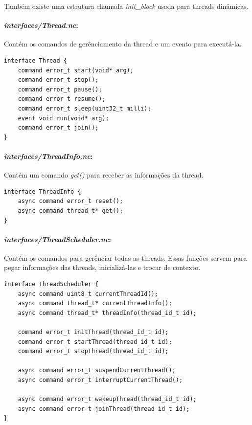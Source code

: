 \documentclass[a4paper, 10pt]{article}
\begin{document}
Também existe uma estrutura chamada \textit{init\_block} usada para threads dinâmicas.

\paragraph{\textit{interfaces/Thread.nc}:} Contém os comandos de gerênciamento da thread e um evento para executá-la.
\begin{lstlisting}
interface Thread {
    command error_t start(void* arg);
    command error_t stop();
    command error_t pause();
    command error_t resume();
    command error_t sleep(uint32_t milli);
    event void run(void* arg);
    command error_t join();
}  
\end{lstlisting}

\paragraph{\textit{interfaces/ThreadInfo.nc}:} Contém um comando \textit{get()} para receber as informações da thread.
\begin{lstlisting}
interface ThreadInfo {
    async command error_t reset();
    async command thread_t* get();
} 
\end{lstlisting}

\paragraph{\textit{interfaces/ThreadScheduler.nc}:} Contém os comandos para gerênciar todas as threads. Essas funções
servem para pegar informações das threads, inicializá-las e trocar de contexto.
\begin{lstlisting}
interface ThreadScheduler {
    async command uint8_t currentThreadId();
    async command thread_t* currentThreadInfo();
    async command thread_t* threadInfo(thread_id_t id);

    command error_t initThread(thread_id_t id);
    command error_t startThread(thread_id_t id);
    command error_t stopThread(thread_id_t id);

    async command error_t suspendCurrentThread();
    async command error_t interruptCurrentThread();

    async command error_t wakeupThread(thread_id_t id);
    async command error_t joinThread(thread_id_t id);
}
\end{lstlisting}
\end{document}
